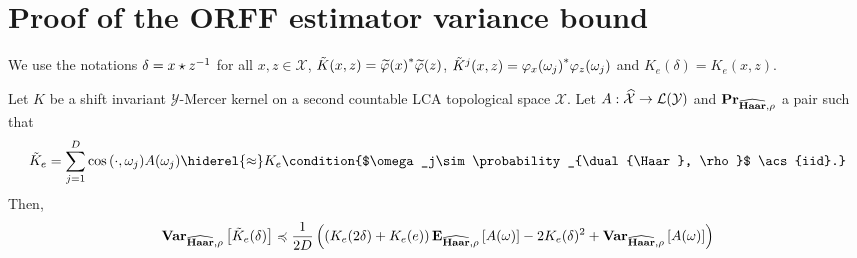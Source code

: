 \section{Proof of the ORFF estimator variance bound}
We use the notations $\delta = x \star z^{-1}$ for all $x, z
\in\mathcal{X}$, $\tilde{K}(x,z) = {\tildePhi{\omega}(x)}^\adjoint
\tildePhi{\omega}(z)$, $\tilde{K}^j(x, z) = {\Phi_x(\omega_j)}^\adjoint
\Phi_z(\omega_j)$ and $K_e(\delta)=K_e(x, z)$.
\begin{proposition}
    \label{pr:variance_bound} 
    Let $K$ be a shift invariant $\mathcal{Y}$-Mercer kernel on a second
    countable \ac{LCA} topological space $\mathcal{X}$. Let
    $A:\widehat{\mathcal{X}}\to\mathcal{L}(\mathcal{Y})$ and
    ${\mathbf{{Pr}}}_{\widehat{\mathbf{Haar}},\rho}$ a pair such that
    \begin{dmath*}
        \tilde{K}_e = \sum_{j=1}^D \cos{\pairing{\cdot,\omega_j}}A (\omega_j)
        \hiderel{\approx}
        K_e\condition{$\omega_j\sim\probability_{\dual{\Haar}, \rho}$
        \acs{iid}.}
    \end{dmath*}
    Then,
    \begin{dmath*}
        \variance_{\dual{\Haar}, \rho} \left[ \tilde{K}_e(\delta) \right]
        \preccurlyeq \frac{1}{2D} \left( \left( K_e(2\delta) + K_e(e) \right)
        \expectation_{\dual{\Haar}, \rho}\left[ A(\omega) \right] -
        2 K_e(\delta)^2 + \variance_{\dual{\Haar}, \rho}\left[
        A(\omega) \right]\right)
    \end{dmath*}
\end{proposition}
